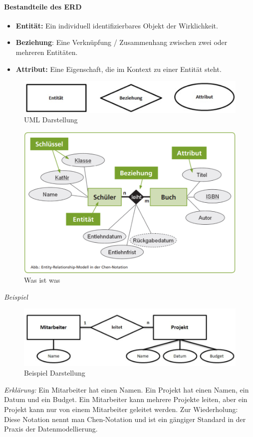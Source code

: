 \paragraph{Bestandteile des ERD}
\begin{itemize}
    \item \textbf{Entität:} Ein individuell identifizierbares Objekt der Wirklichkeit.
    \item \textbf{Beziehung}: Eine Verknüpfung / Zusammenhang zwischen zwei oder mehreren Entitäten.
    \item \textbf{Attribut:} Eine Eigenschaft, die im Kontext zu einer Entität steht.
\end{itemize}

\begin{figure}[h]
    \centering
    \includegraphics[width=.8\textwidth]{Content/images/modellierung/erd.png}
    \caption{UML Darstellung}
    \label{fig:modellierung:erd}
\end{figure}
\begin{figure}[h]
    \centering
    \includegraphics[width=.8\textwidth]{Content/images/modellierung/erde.png}
    \caption{Was ist was}
    \label{fig:modellierung:erde}
\end{figure}

\textit{Beispiel}

\begin{figure}[h]
    \centering
    \includegraphics[width=.8\textwidth]{Content/images/modellierung/bsp.png}
    \caption{Beispiel Darstellung}
    \label{fig:modellierung:bsp}
\end{figure}
\textit{Erklärung:}
Ein Mitarbeiter hat einen Namen. Ein Projekt hat einen Namen, ein Datum und ein Budget. Ein Mitarbeiter kann mehrere Projekte leiten, aber ein Projekt kann nur von einem Mitarbeiter geleitet werden. 
Zur Wiederholung: Diese Notation nennt man Chen-Notation und ist ein gängiger Standard in der Praxis der Datenmodellierung.

